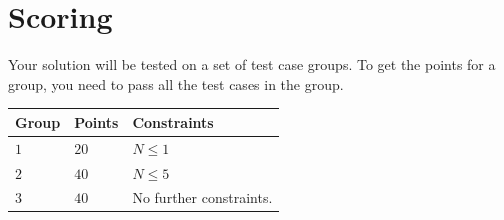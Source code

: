\section*{Scoring}
Your solution will be tested on a set of test case groups.
To get the points for a group, you need to pass all the test cases in the group.

\noindent
\begin{tabular}{| l | l | p{10cm} |}
\hline
Group & Points & Constraints \\ \hline
  $1$    & $20$        & $N \le 1$ \\ \hline 
  $2$    & $40$        & $N \le 5$ \\ \hline
  $3$    & $40$        & No further constraints. \\ \hline 
\end{tabular}

